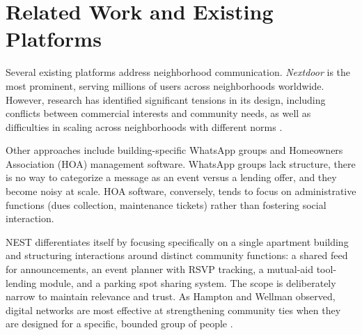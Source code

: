 \section{Related Work and Existing Platforms}

Several existing platforms address neighborhood communication. \textit{Nextdoor} is the most prominent, serving millions of users across neighborhoods worldwide. However, research has identified significant tensions in its design, including conflicts between commercial interests and community needs, as well as difficulties in scaling across neighborhoods with different norms \cite{masden2014tensions}.

Other approaches include building-specific WhatsApp groups and Homeowners Association (HOA) management software. WhatsApp groups lack structure, there is no way to categorize a message as an event versus a lending offer, and they become noisy at scale. HOA software, conversely, tends to focus on administrative functions (dues collection, maintenance tickets) rather than fostering social interaction.

NEST differentiates itself by focusing specifically on a single apartment building and structuring interactions around distinct community functions: a shared feed for announcements, an event planner with RSVP tracking, a mutual-aid tool-lending module, and a parking spot sharing system. The scope is deliberately narrow to maintain relevance and trust. As Hampton and Wellman observed, digital networks are most effective at strengthening community ties when they are designed for a specific, bounded group of people \cite{hampton2003neighboring}.